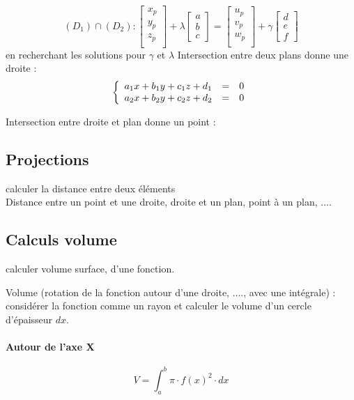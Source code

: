 \begin{equation}
(D_1)\cap(D_2):
\begin{bmatrix}
x_p\\
y_p\\
z_p\\
\end{bmatrix}
+
\lambda
\begin{bmatrix}
a\\
b \\
c
\end{bmatrix}
=
\begin{bmatrix}
u_p\\
v_p\\
w_p\\
\end{bmatrix}
+
\gamma
\begin{bmatrix}
d\\
e \\
f
\end{bmatrix}
\end{equation}
en recherchant les solutions pour $\gamma$ et $\lambda$
\medbreak
Intersection entre deux plans donne une droite : 
\begin{eqnarray}
\left\{
\begin{array}{l c r}
a_1x+b_1 y+c_1 z+d_1 &=&0\\
a_2 x+ b_2 y + c_2 z + d_2 &=&0
\end{array}
\right.
\end{eqnarray}

Intersection entre droite et plan donne un point :


\subsection{Projections}
calculer la distance entre deux éléments\\
Distance entre un point et une droite, droite et un plan, point à un plan, ....
\subsection{Calculs volume}

calculer volume surface, d'une fonction.

Volume (rotation de la fonction autour d'une droite, ...., avec une intégrale) : considérer la fonction comme un rayon et calculer le volume d'un cercle d'épaisseur $dx$.\\
\paragraph{Autour de l'axe X}
\begin{equation}
V=\int_{a}^{b}\pi \cdot f(x)^2 \cdot dx
\end{equation}
